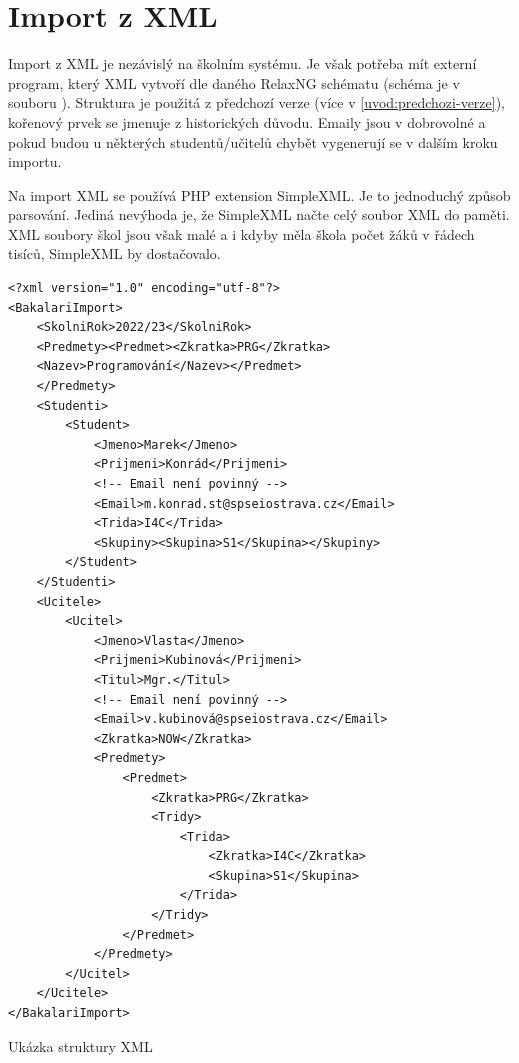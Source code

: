 \section{Import z XML}
Import z XML je nezávislý na školním systému. Je však potřeba mít externí program, který XML vytvoří dle daného RelaxNG schématu (schéma je v souboru ). Struktura je použitá z předchozí verze (více v \ref{uvod:predchozi-verze}), kořenový prvek se jmenuje  z historických důvodu. Emaily jsou v dobrovolné a pokud budou u některých studentů/učitelů chybět vygenerují se v dalším kroku importu.

Na import XML se používá PHP extension SimpleXML. Je to jednoduchý způsob parsování. Jediná nevýhoda je, že SimpleXML načte celý soubor XML do paměti. XML soubory škol jsou však malé a i kdyby měla škola počet žáků v řádech tisíců, SimpleXML by dostačovalo. 




\begin{code}[H]
  \begin{verbatim}
<?xml version="1.0" encoding="utf-8"?>
<BakalariImport>
    <SkolniRok>2022/23</SkolniRok>
    <Predmety><Predmet><Zkratka>PRG</Zkratka>
    <Nazev>Programování</Nazev></Predmet>
    </Predmety>
    <Studenti>
        <Student>
            <Jmeno>Marek</Jmeno>
            <Prijmeni>Konrád</Prijmeni>
            <!-- Email není povinný -->
            <Email>m.konrad.st@spseiostrava.cz</Email>
            <Trida>I4C</Trida>
            <Skupiny><Skupina>S1</Skupina></Skupiny>
        </Student>
    </Studenti>
    <Ucitele>
        <Ucitel>
            <Jmeno>Vlasta</Jmeno>
            <Prijmeni>Kubinová</Prijmeni>
            <Titul>Mgr.</Titul>
            <!-- Email není povinný -->
            <Email>v.kubinová@spseiostrava.cz</Email>
            <Zkratka>NOW</Zkratka>
            <Predmety>
                <Predmet>
                    <Zkratka>PRG</Zkratka>
                    <Tridy>
                        <Trida>
                            <Zkratka>I4C</Zkratka>
                            <Skupina>S1</Skupina>
                        </Trida>
                    </Tridy>
                </Predmet>
            </Predmety>
        </Ucitel>       
    </Ucitele>
</BakalariImport>
\end{verbatim}
\caption{Ukázka struktury XML}
\end{code}


